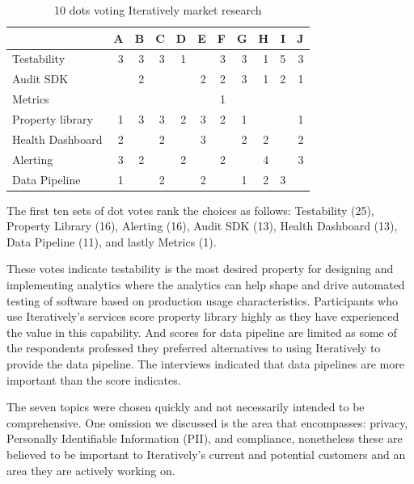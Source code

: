 \begin{table}[htbp!]
 
    \centering
    \small
    \setlength{\tabcolsep}{4pt} %
    \begin{tabular}{lrrrrrrrrrr}
         &A  &B  &C  &D  &E  &F  &G  &H  &I  &J \\
    \hline     
    Testability          &3  &3  &3  &1  &   &3  &3  &1  &5  &3 \\
    Audit SDK            &   &2  &   &   &2  &2  &3  &1  &2  &1 \\
    Metrics              &   &   &   &   &   &1  &   &   &   &  \\
    Property library     &1  &3  &3  &2  &3  &2  &1  &   &   &1 \\
    Health Dashboard     &2  &   &2  &   &3  &   &2  &2  &   &2 \\
    Alerting             &3  &2  &   &2  &   &2  &   &4  &   &3 \\
    Data Pipeline        &1  &   &2  &   &2  &   &1  &2  &3  &  \\
         
    \end{tabular}
    \caption{10 dots voting Iteratively market research}
    \label{tab:10dots_voting_iteratively}

\end{table}

The first ten sets of dot votes rank the choices as follows: Testability (25), Property Library (16), Alerting (16), Audit SDK (13), Health Dashboard (13), Data Pipeline (11), and lastly Metrics (1). 

These votes indicate testability is the most desired property for designing and implementing analytics where the analytics can help shape and drive automated testing of software based on production usage characteristics. Participants who use Iteratively's services score property library highly as they have experienced the value in this capability. And scores for data pipeline are limited as some of the respondents professed they preferred alternatives to using Iteratively to provide the data pipeline. The interviews indicated that data pipelines are more important than the score indicates.

The seven topics were chosen quickly and not necessarily intended to be comprehensive. One omission we discussed is the area that encompasses: privacy, Personally Identifiable Information (PII), and compliance, nonetheless these are believed to be important to Iteratively's current and potential customers and an area they are actively working on.

